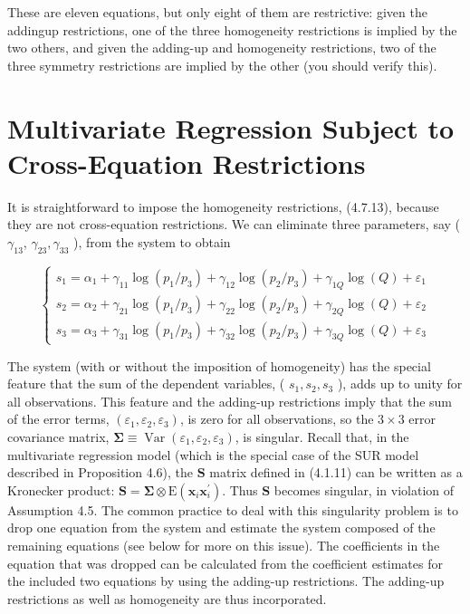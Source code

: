 \documentclass[10pt]{article}
\begin{document}
These are eleven equations, but only eight of them are restrictive: given the addingup restrictions, one of the three homogeneity restrictions is implied by the two others, and given the adding-up and homogeneity restrictions, two of the three symmetry restrictions are implied by the other (you should verify this).

\section*{Multivariate Regression Subject to Cross-Equation Restrictions}
It is straightforward to impose the homogeneity restrictions, (4.7.13), because they are not cross-equation restrictions. We can eliminate three parameters, say ( $\gamma_{13}$, $\gamma_{23}, \gamma_{33}$ ), from the system to obtain

\[
\left\{\begin{array}{l}
s_{1}=\alpha_{1}+\gamma_{11} \log \left(p_{1} / p_{3}\right)+\gamma_{12} \log \left(p_{2} / p_{3}\right)+\gamma_{1 Q} \log (Q)+\varepsilon_{1}  \tag{4.7.15}\\
s_{2}=\alpha_{2}+\gamma_{21} \log \left(p_{1} / p_{3}\right)+\gamma_{22} \log \left(p_{2} / p_{3}\right)+\gamma_{2 Q} \log (Q)+\varepsilon_{2} \\
s_{3}=\alpha_{3}+\gamma_{31} \log \left(p_{1} / p_{3}\right)+\gamma_{32} \log \left(p_{2} / p_{3}\right)+\gamma_{3 Q} \log (Q)+\varepsilon_{3}
\end{array}\right.
\]

The system (with or without the imposition of homogeneity) has the special feature that the sum of the dependent variables, ( $s_{1}, s_{2}, s_{3}$ ), adds up to unity for all observations. This feature and the adding-up restrictions imply that the sum of the error terms, $\left(\varepsilon_{1}, \varepsilon_{2}, \varepsilon_{3}\right)$, is zero for all observations, so the $3 \times 3$ error covariance matrix, $\boldsymbol{\Sigma} \equiv \operatorname{Var}\left(\varepsilon_{1}, \varepsilon_{2}, \varepsilon_{3}\right)$, is singular. Recall that, in the multivariate regression model (which is the special case of the SUR model described in Proposition 4.6), the $\mathbf{S}$ matrix defined in (4.1.11) can be written as a Kronecker product: $\mathbf{S}=\boldsymbol{\Sigma} \otimes \mathrm{E}\left(\mathbf{x}_{i} \mathbf{x}_{i}^{\prime}\right)$. Thus $\mathbf{S}$ becomes singular, in violation of Assumption 4.5. The common practice to deal with this singularity problem is to drop one equation from the system and estimate the system composed of the remaining equations (see below for more on this issue). The coefficients in the equation that was dropped can be calculated from the coefficient estimates for the included two equations by using the adding-up restrictions. The adding-up restrictions as well as homogeneity are thus incorporated.
\end{document}
